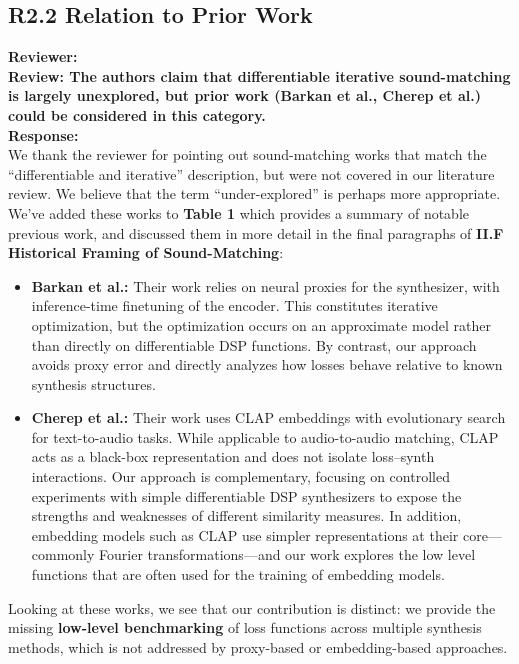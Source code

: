 \documentclass[11pt]{article}
\begin{document}
\subsection{R2.2 Relation to Prior Work}
\label{R2.2}
\noindent\textbf{Reviewer:}\\
\noindent \textbf{Review: The authors claim that differentiable iterative sound-matching is largely unexplored, but prior work (Barkan et al., Cherep et al.) could be considered in this category.}\\

\noindent\textbf{Response:} \\
We thank the reviewer for pointing out sound-matching works that match the ``differentiable and iterative'' description, but were not covered in our literature review. We believe that the term ``under-explored'' is perhaps more appropriate. We've added these works to \textbf{Table 1} which provides a summary of notable previous work, and discussed them in more detail in the final paragraphs of \textbf{II.F Historical Framing of Sound-Matching}: 
\begin{itemize}
  \item \textbf{Barkan et al.:} Their work relies on neural proxies for the synthesizer, with inference-time finetuning of the encoder. This constitutes iterative optimization, but the optimization occurs on an approximate model rather than directly on differentiable DSP functions. By contrast, our approach avoids proxy error and directly analyzes how losses behave relative to known synthesis structures.  
  \item \textbf{Cherep et al.:} Their work uses CLAP embeddings with evolutionary search for text-to-audio tasks. While applicable to audio-to-audio matching, CLAP acts as a black-box representation and does not isolate loss--synth interactions. Our approach is complementary, focusing on controlled experiments with simple differentiable DSP synthesizers to expose the strengths and weaknesses of different similarity measures.  In addition, embedding models such as CLAP use simpler representations at their core---commonly Fourier transformations---and our work explores the low level functions that are often used for the training of embedding models.
\end{itemize}
Looking at these works, we see that our contribution is distinct: we provide the missing \textbf{low-level benchmarking} of loss functions across multiple synthesis methods, which is not addressed by proxy-based or embedding-based approaches.
\end{document}
